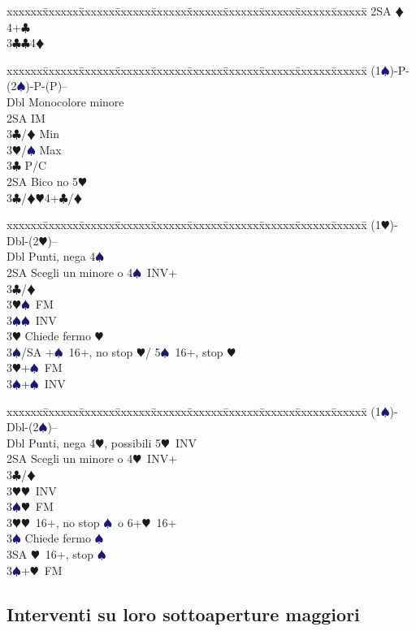 \documentclass[a4paper,italian]{article}
\newcommand{\BC}{\textcolor{OliveGreen}{$\clubsuit$}}
\newcommand{\BD}{\textcolor{RedOrange}{$\vardiamondsuit$}}
\newcommand{\BH}{\textcolor{Red2}{$\varheartsuit${}}}
\newcommand{\BS}{\textcolor{MidnightBlue}{$\spadesuit${}}}
\newenvironment{bidtable}
{\begin{tabbing}

    xxxxxx\=xxxxxx\=xxxxxx\=xxxxxx\=xxxxxx\=xxxxxx\=xxxxxx\=xxxxxx\=xxxxxx\=xxxxxx\=\kill}
{\end{tabbing} }%
\begin{document}
\begin{multicols}{2}
\begin{bidtable}
        2SA \BD 4+\BC \\
        3\BC {}\BC 4\BD
    \end{bidtable}
    \begin{bidtable}
        (1\BS)-P-(2\BS)-P-(P)--\+\\
        Dbl \> Monocolore minore\+\\
        2SA \> IM\+\\
        3\BC/\BD \> Min\\
        3\BH/\BS \> Max\-\\
        3\BC \> P/C\-\\
        2SA \> Bico no 5\BH \\
        3\BC/\BD {}\BH 4+\BC /\BD
    \end{bidtable}
    \begin{bidtable}
        (1\BH)-Dbl-(2\BH)--\+\\
        Dbl\> Punti, nega 4\BS\\
        2SA \> Scegli un minore o 4\BS\ INV+\+\\
        3\BC/\BD\+\\
        3\BH {}\BS\ FM\\
        3\BS {}\BS\ INV\-\\
        3\BH \> Chiede fermo \BH\\
        3\BS/SA +\BS\ 16+, no stop \BH / 5\BS\ 16+, stop \BH\-\\
        3\BH {}+\BS\ FM\\
        3\BS {}+\BS\ INV
    \end{bidtable}
    \begin{bidtable}
        (1\BS)-Dbl-(2\BS)--\+\\
        Dbl\> Punti, nega 4\BH, possibili 5\BH\ INV\\
        2SA \> Scegli un minore o 4\BH\ INV+\+\\
        3\BC/\BD\+\\
        3\BH {}\BH\ INV\\
        3\BS {}\BH\ FM\-\\
        3\BH {}\BH\ 16+, no stop \BS\ o 6+\BH\ 16+\\
        3\BS \> Chiede fermo \BS\\
        3SA \BH\ 16+, stop \BS\-\\
        3\BS {}+\BH\ FM
    \end{bidtable}

    \subsection{Interventi su loro sottoaperture maggiori}


\end{multicols}
\end{document}
